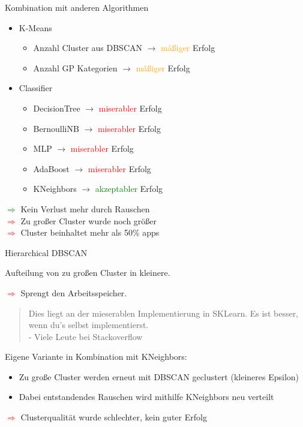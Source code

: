 \documentclass[compress,t]{beamer}
\begin{document}
\begin{frame}{Kombination mit anderen Algorithmen}

    \begin{itemize}
        \item K-Means
            \begin{itemize}
                \item Anzahl Cluster aus DBSCAN \(\rightarrow\) \textcolor{orange}{mäßiger} Erfolg
                \item Anzahl GP Kategorien \(\rightarrow\) \textcolor{orange}{mäßiger} Erfolg
            \end{itemize}
        \item Classifier
            \begin{itemize}
                \item DecisionTree \(\rightarrow\) \textcolor{red}{miserabler} Erfolg
                \item BernoulliNB \(\rightarrow\) \textcolor{red}{miserabler} Erfolg
                \item MLP \(\rightarrow\) \textcolor{red}{miserabler} Erfolg
                \item AdaBoost \(\rightarrow\) \textcolor{red}{miserabler} Erfolg
                \item KNeighbors  \(\rightarrow\) \textcolor{green}{akzeptabler} Erfolg
            \end{itemize}
    \end{itemize}

    \textcolor{green}{\(\Rightarrow\)} Kein Verlust mehr durch Rauschen\\
    \textcolor{red}{\(\Rightarrow\)} Zu großer Cluster wurde noch größer\\
    \textcolor{red}{\(\Rightarrow\)} Cluster beinhaltet mehr als 50\% apps

\end{frame}

\begin{frame}{Hierarchical DBSCAN}

    Aufteilung von zu großen Cluster in kleinere.

    \textcolor{red}{\(\Rightarrow\)} Sprengt den Arbeitsspeicher.
    \begin{quote}
        Dies liegt an der mieserablen Implementierung in SKLearn.
        Es ist besser, wenn du's selbst implementierst.\\
        - Viele Leute bei Stackoverflow
    \end{quote}

    Eigene Variante in Kombination mit KNeighbors:
    \begin{itemize}
        \item Zu große Cluster werden erneut mit DBSCAN geclustert (kleineres Epsilon)
        \item Dabei entstandendes Rauschen wird mithilfe KNeighbors neu verteilt
    \end{itemize}

    \textcolor{red}{\(\Rightarrow\)} Clusterqualität wurde schlechter, kein guter Erfolg

\end{frame}
\end{document}

